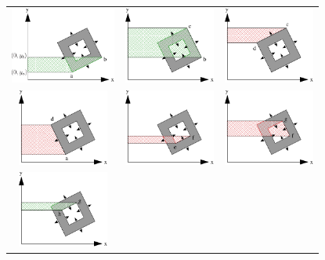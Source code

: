 \documentclass[11pt]{article}
\begin{document}
\begin{figure}[ht!]
\begin{center}
\begin{tabular}{ccc}
\includegraphics[height=2.5cm]{trapezoid_integrals_ab.pdf}&
\includegraphics[height=2.5cm]{trapezoid_integrals_bc.pdf}&
\includegraphics[height=2.5cm]{trapezoid_integrals_cd.pdf}\\
\includegraphics[height=2.5cm]{trapezoid_integrals_da.pdf}&
\includegraphics[height=2.5cm]{trapezoid_integrals_ef.pdf}&
\includegraphics[height=2.5cm]{trapezoid_integrals_fg.pdf}\\
\includegraphics[height=2.5cm]{trapezoid_integrals_gh.pdf}&

\end{tabular}
\end{center}
\end{figure}
\end{document}
